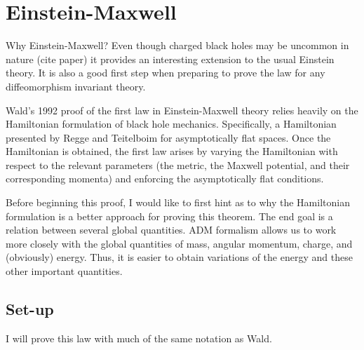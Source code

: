 \documentclass[titlepage]{article}
\begin{document}





\section{Einstein-Maxwell}

Why Einstein-Maxwell?  Even though charged black holes may be uncommon in nature (cite paper) it provides an interesting extension to the usual Einstein theory.  It is also a good first step when preparing to prove the law for any diffeomorphism invariant theory.

Wald's 1992 proof of the first law in Einstein-Maxwell theory relies heavily on the Hamiltonian formulation of black hole mechanics. Specifically, a Hamiltonian presented by Regge and Teitelboim \cite{regge1974improved} for asymptotically flat spaces.  Once the Hamiltonian is obtained, the first law arises by varying the Hamiltonian with respect to the relevant parameters (the metric, the Maxwell potential, and their corresponding momenta) and enforcing the asymptotically flat conditions. 

Before beginning this proof, I would like to first hint as to why the Hamiltonian formulation is a better approach for proving this theorem.  The end goal is a relation between several global quantities.  ADM formalism allows us to work more closely with the global quantities of mass, angular momentum, charge, and (obviously) energy.  Thus, it is easier to obtain variations of the energy and these other important quantities.

\subsection{Set-up}

I will prove this law with much of the same notation as Wald.
\end{document}
